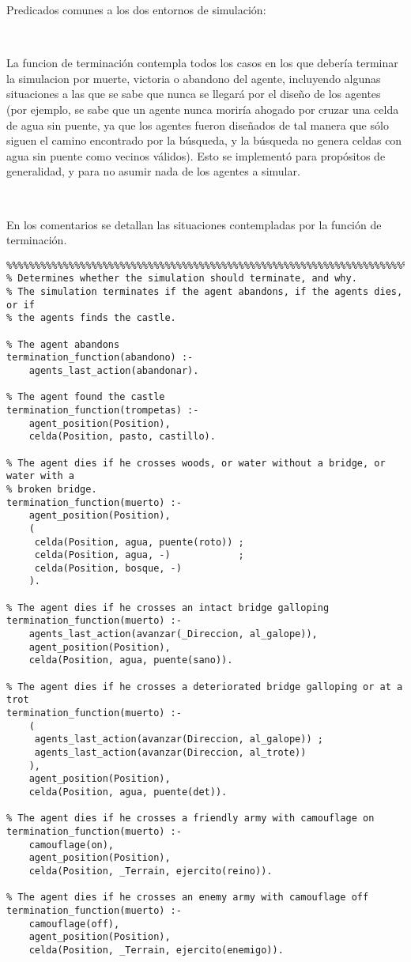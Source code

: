 \documentclass[a4paper,12pt]{report}
\begin{document}
Predicados comunes a los dos entornos de simulaci\'{o}n:

\

La funcion de terminaci\'{o}n contempla todos los casos en los que deber\'{i}a terminar la simulacion por muerte,
victoria o abandono del agente, incluyendo algunas situaciones a las que se sabe que nunca se llegar\'{a} por el
dise\~{n}o de los agentes (por ejemplo, se sabe que un agente nunca morir\'{i}a ahogado por cruzar una celda de agua sin
puente, ya que los agentes fueron dise\~{n}ados de tal manera que s\'{o}lo siguen el camino encontrado por la
b\'{u}squeda, y la b\'{u}squeda no genera celdas con agua sin puente como vecinos v\'{a}lidos).
Esto se implement\'{o} para prop\'{o}sitos de generalidad, y para no asumir nada de los agentes a simular.

\

En los comentarios se detallan las situaciones contempladas por la funci\'{o}n de terminaci\'{o}n.

\begin{verbatim}
%%%%%%%%%%%%%%%%%%%%%%%%%%%%%%%%%%%%%%%%%%%%%%%%%%%%%%%%%%%%%%%%%%%%%%%%%%%%%%%%
% Determines whether the simulation should terminate, and why.
% The simulation terminates if the agent abandons, if the agents dies, or if
% the agents finds the castle.

% The agent abandons
termination_function(abandono) :-
    agents_last_action(abandonar).

% The agent found the castle
termination_function(trompetas) :-
    agent_position(Position),
    celda(Position, pasto, castillo).

% The agent dies if he crosses woods, or water without a bridge, or water with a
% broken bridge.
termination_function(muerto) :-
    agent_position(Position),
    (
     celda(Position, agua, puente(roto)) ;
     celda(Position, agua, -)            ;
     celda(Position, bosque, -)
    ).

% The agent dies if he crosses an intact bridge galloping
termination_function(muerto) :-
    agents_last_action(avanzar(_Direccion, al_galope)),
    agent_position(Position),
    celda(Position, agua, puente(sano)).

% The agent dies if he crosses a deteriorated bridge galloping or at a trot
termination_function(muerto) :-
    (
     agents_last_action(avanzar(Direccion, al_galope)) ;
     agents_last_action(avanzar(Direccion, al_trote))
    ),
    agent_position(Position),
    celda(Position, agua, puente(det)).

% The agent dies if he crosses a friendly army with camouflage on
termination_function(muerto) :-
    camouflage(on),
    agent_position(Position),
    celda(Position, _Terrain, ejercito(reino)).

% The agent dies if he crosses an enemy army with camouflage off
termination_function(muerto) :-
    camouflage(off),
    agent_position(Position),
    celda(Position, _Terrain, ejercito(enemigo)).

\end{verbatim}
\end{document}
